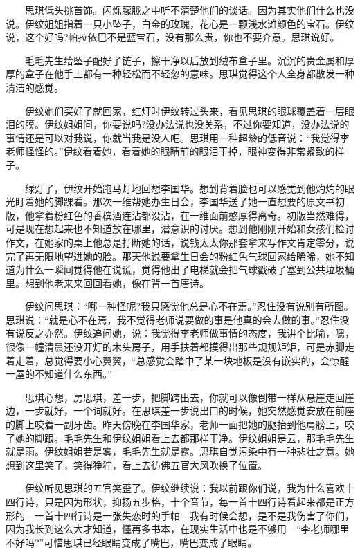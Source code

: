 \documentclass[12pt,UTF8]{ctexbook}
\begin{document}
　　思琪低头挑首饰。闪烁朦胧之中听不清楚他们的谈话。因为其实他们什么也没说。伊纹姐姐指着一只小坠子，白金的玫瑰，花心是一颗浅水滩颜色的宝石。伊纹说，这个好吗?帕拉依巴不是蓝宝石，没有那么贵，你也不要介意。思琪说好。

　　毛毛先生给坠子配好了链子，擦干净以后放到绒布盒子里。沉沉的贵金属和厚厚的盒子在他手上都有一种轻松而不轻忽的意味。思琪觉得这个人全身都散发一种清洁的感觉。

　　伊纹她们买好了就回家，红灯时伊纹转过头来，看见思琪的眼球覆盖着一层眼泪的膜。伊纹姐姐问，你要说吗?没办法说也没关系，不过你要知道，没办法说的事情还是可以对我说，你就当我是没人吧。思琪用一种超龄的低音说：\enquote{我觉得李老师怪怪的。}伊纹看着她，看着她的眼睛前的眼泪干掉，眼神变得非常紧致的样子。

　　绿灯了，伊纹开始跑马灯地回想李国华。想到背着脸也可以感觉到他灼灼的眼光盯着她的脚踝看。那次一维帮她办生日会，李国华送了她一直想要的原文书初版，他拿着粉红色的香槟酒连沾都没沾，在一维面前憨厚得离奇。初版当然难得，可是现在想起来也不知道放在哪里，潜意识的讨厌。想到他刚刚开始和女孩们检讨作文，在她家的桌上他总是打断她的话，说钱太太你那套拿来写作文肯定零分，说完了再无限地望进她的脸。那天他说要拿生日会的粉红色气球回家给晞晞，她不知道为什么一瞬间觉得他在说谎，觉得他出了电梯就会把气球戳破了塞到公共垃圾桶里。想到他老来来回回看她，像在背一首唐诗。

　　伊纹问思琪：\enquote{哪一种怪呢?我只感觉他总是心不在焉。}忍住没有说别有所图。思琪说：\enquote{就是心不在焉，我不觉得老师说要做的事是他真的会去做的事。}忍住没有说反之亦然。伊纹追问她，说：我觉得李老师做事情的态度，我讲个比喻，嗯，很像一幢清晨还没开灯的木头房子，用手扶着都摸得出那些规规矩矩，可是赤脚走着走着，总觉得要小心翼翼，\enquote{总感觉会踏中了某一块地板是没有嵌实的，会惊醒一屋的不知道什么东西。}

　　思琪心想，房思琪，差一步，把脚跨出去，你就可以像倒带一样从悬崖走回崖边，一步就好，一个词就好。在思琪差一步说出口的时候，她突然感觉安放在前座的脚上咬着一副牙齿。昨天傍晚在李国华家，老师一面把她的腿抬到他肩膀上，咬了她的脚跟。毛毛先生和伊纹姐姐看上去都那样干净。伊纹姐姐是云，那毛毛先生就是雨。伊纹姐姐若是雾，毛毛先生就是露。思琪自觉污染中有一种悲壮之意。她想到这里笑了，笑得狰狞，看上去彷佛五官大风吹换了位置。

　　伊纹听见思琪的五官笑歪了。伊纹继续说：我以前跟你们说，我为什么喜欢十四行诗，只是因为形状，抑扬五步格，十个音节，每一首十四行诗看起来都是正方形的---一首十四行诗是一张失恋时的手帕---我有时候会想，是不是我伤害了你们，因为我长到这么大才知道，懂再多书本，在现实生活中也是不够用---\enquote{李老师哪里不好吗?}可惜思琪已经眼睛变成了嘴巴，嘴巴变成了眼睛。
\end{document}
